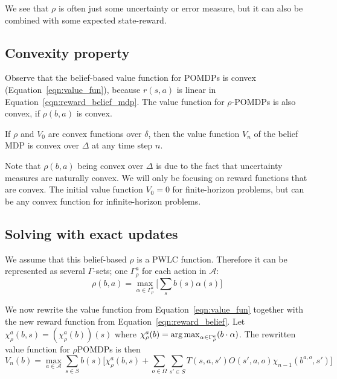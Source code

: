 We see that $\rho$ is often just some uncertainty or error measure, but it can also be combined with some expected state-reward.

\subsection{Convexity property}

Observe that the belief-based value function for POMDPs is convex (Equation~\ref{eqn:value_fun}), because $r(s,a)$ is linear in Equation~\ref{eqn:reward_belief_mdp}. The value function for $\rho$-POMDPs is also convex, if $\rho(b,a)$ is convex.

\begin{theorem}
	If $\rho$ and $V_0$ are convex functions over $\delta$, then the value function $V_n$ of the belief MDP is convex over $\Delta$ at any time step $n$.
\end{theorem}

Note that $\rho(b,a)$ being convex over $\Delta$ is due to the fact that uncertainty measures are naturally convex\cite{p:belief-dependent-rewards}. We will only be focusing on reward functions that are convex. The initial value function $V_0=0$ for finite-horizon problems, but can be any convex function for infinite-horizon problems.

\subsection{Solving with exact updates}
We assume that this belief-based $\rho$ is a PWLC function. Therefore it can be represented as several $\Gamma$-sets; one $\Gamma^a_\rho$ for each action in $\mathcal{A}$:
\begin{equation}
	\label{eqn:reward_belief}
	\rho(b,a)=\max_{\alpha\in\Gamma^a_\rho}\big[\sum_{s}b(s)\alpha(s)\big]
\end{equation}

We now rewrite the value function from Equation~\ref{eqn:value_fun} together with the new reward
function from Equation~\ref{eqn:reward_belief}. Let $\chi_\rho^a(b,s) = (\chi_\rho^a(b))(s)$ where $\chi_\rho^a(b)=\operatorname*{arg\,max}_{\alpha\in\Gamma^a_\rho}(b\cdot\alpha)$. The rewritten value function for $\rho$POMDPs is then
\begin{equation}
	V_n(b)= \max_{a\in \mathcal{A}}\sum_{s\in S}b(s) \big[\chi_\rho^a(b,s) + \sum_{o\in \Omega}\sum_{s'\in S}T(s,a,s')O(s',a,o)\chi_{n-1}(b^{a,o},s') \big]
\end{equation}

